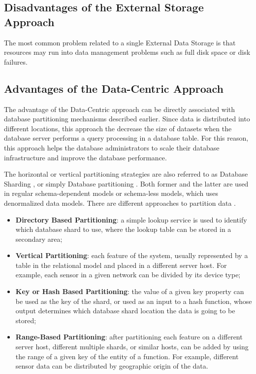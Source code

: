 \subsection{Disadvantages of the External Storage Approach}

The most common problem related to a single External Data Storage is that
resources may run into data management problems such as full disk space or disk
failures.

\subsection{Advantages of the Data-Centric Approach}

The advantage of the Data-Centric approach can be directly associated with
database partitioning mechanisms described earlier. Since data is distributed
into different locations, this approach the decrease the size of datasets when
the database server performs a query processing in a database table. For this
reason, this approach helps the database administrators to scale their
database infrastructure and improve the database performance.

The horizontal or vertical partitioning strategies are also referred to as
Database Sharding \cite{db-shard-discussion}, or simply Database partitioning
\cite{db-table-partition} \cite{db-partitioning-relational}. Both former and
the latter are used in regular schema-dependent models or schema-less
models, which uses denormalized data models. There are different approaches to
partition data \cite{db-shard-schemas} \cite{db-partitioning-relational}
\cite{db-partitioning-relational-oracle}.

\begin{itemize}
  \item \textbf{Directory Based Partitioning}: a simple lookup service is used
  to identify which database shard to use, where the lookup table can be stored
  in a secondary area;
  \item \textbf{Vertical Partitioning}: each feature of the system, usually
  represented by a table in the relational model and placed in a different
  server host. For example, each sensor in a given network can be divided by 
  its device type;
  \item \textbf{Key or Hash Based Partitioning}: the value of a given key
  property can be used as the key of the shard, or used as an input to a hash
  function, whose output determines which database shard location the data is
  going to be stored;
  \item \textbf{Range-Based Partitioning}: after partitioning each feature on a
  different server host, different multiple shards, or similar hosts, can be
  added by using the range of a given key of the entity of a function. For
  example, different sensor data can be distributed by geographic origin of
  the data.
\end{itemize}


